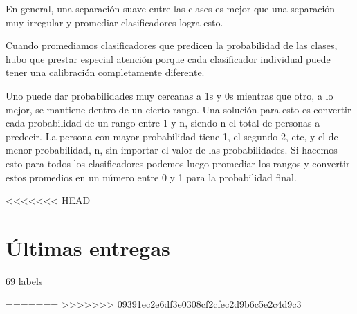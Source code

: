 \documentclass[a4paper ,12pt]{article}
\begin{document}
En general, una separación suave entre las clases es mejor que una separación
muy irregular y promediar clasificadores logra esto.

Cuando promediamos clasificadores que predicen la probabilidad de las clases, hubo
que prestar especial atención porque cada clasificador individual puede tener una calibración completamente diferente. 

Uno puede dar probabilidades muy cercanas a 1s y 0s mientras que otro, a lo mejor, se mantiene dentro de un cierto rango.
Una solución para esto es convertir cada probabilidad de un rango entre 1 y n, siendo n el total de personas a predecir. La persona con mayor probabilidad tiene 1,
el segundo 2, etc, y el de menor probabilidad, n, sin importar el valor de las probabilidades. Si hacemos esto para todos los clasificadores podemos luego
promediar los rangos y convertir estos promedios en un número entre 0 y 1 para la probabilidad final.


\newpage

<<<<<<< HEAD
\section{Últimas entregas}

69 labels

\newpage
=======
>>>>>>> 09391ec2e6df3e0308cf2cfec2d9b6c5e2c4d9c3
\end{document}
